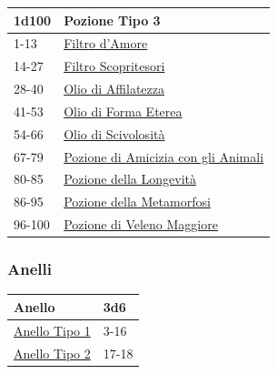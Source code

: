 \begin{multicols}{2}
{\medskip\hypertarget{Pozione Tipo 3}{}

{\small\begin{tabular}{ll}
		\toprule
\textbf{1d100} & \textbf{Pozione Tipo 3}\\
\toprule
1-13& \hyperlink{Filtrod'Amore}{Filtro d'Amore}\\
14-27 & \hyperlink{FiltroScopritesori}{Filtro Scopritesori}\\
28-40 & \hyperlink{OliodiAffilatezza}{Olio di Affilatezza}\\
41-53 & \hyperlink{OliodiFormaEterea}{Olio di Forma Eterea}\\
54-66 & \hyperlink{OliodiScivolosità}{Olio di Scivolosità}\\
67-79 & \hyperlink{PozionediAmiciziacongliAnimali}{Pozione di Amicizia con gli Animali}\\
80-85 & \hyperlink{PozionedellaLongevità}{Pozione della Longevità}\\
86-95 & \hyperlink{PozionedellaMetamorfosi}{Pozione della Metamorfosi}\\
96-100&\hyperlink{pozionifiltri}{Pozione di Veleno Maggiore}
\end{tabular}}

\subsubsection{Anelli}\hypertarget{anellimagici}{}\label{anellimagici}

{\small\begin{tabular}{ll}
		\toprule
\textbf{Anello}&\textbf{3d6}\\
\toprule
\hyperlink{Pozione Tipo 3}{Anello Tipo 1} &3-16\\
\hyperlink{Pozione Tipo 3}{Anello Tipo 2} &17-18
\end{tabular}}

\medskip\hypertarget{Anello Tipo 1}{}

}
\end{multicols}
